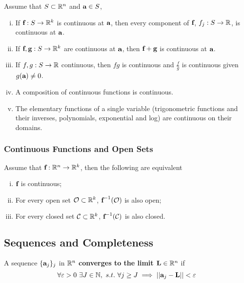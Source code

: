 \documentclass[11pt]{article}
\newcommand{\vef}[0]{\ve{f}}
\newcommand{\veg}[0]{\ve{g}}
\begin{document}
				\begin{theorem}
					Assume that $S \subset \mathbb{R}^n$ and $\textbf{a} \in S$,
					\begin{enumerate}[(i)]
						\item If $\vef: S \to \R^k$ is continuous at $\textbf{a}$, then every component of $\vef$, $f_j: S \to \mathbb{R}$, is continuous at $\textbf{a}$.
						\item If $\vef, \veg: S \to \R^k$ are continuous at $\textbf{a}$, then $\vef + \veg$ is continuous at $\textbf{a}$.
						\item If $f, g: S \to \mathbb{R}$ continuous, then $fg$ is continuous and $\frac{f}{g}$ is continuous given $g(\textbf{a}) \neq 0$.
						\item A composition of continuous functions is continuous.
						\item The elementary functions of a single variable (trigonometric functions and their inverses, polynomials, exponential and log) are continuous on their domains.
					\end{enumerate}
				\end{theorem}
			\subsubsection{Continuous Functions and Open Sets}
				\begin{theorem}
					Assume that $\vef: \R^n \to \R^k$, then the following are equivalent
					\begin{enumerate}[(i)]
						\item $\vef$ is continuous;
						\item For every open set $\mathcal{{O}} \subset \mathbb{R}^k$, $\vef^{-1}(\mc{O})$ is also open;
						\item For every closed set $\mathcal{{C}} \subset \mathbb{R}^k$, $\vef^{-1}(\mc{C})$ is also closed.
					\end{enumerate}
				\end{theorem}
		\subsection{Sequences and Completeness}
			\begin{definition}
		    	    A sequence $\{\textbf{a}_j\}_j$ in $\mathbb{R}^n$ \textbf{converges to the limit $\textbf{L} \in \mathbb{R}^n$} if 
		    	    \begin{equation}
		    	    	\forall \varepsilon > 0\ \exists J \in \N,\ s.t.\ \forall j \geq J \implies \norm{\vea_j - \ve{L}} < \varepsilon
		    	    \end{equation}
		    \end{definition}
		    
\end{document}
